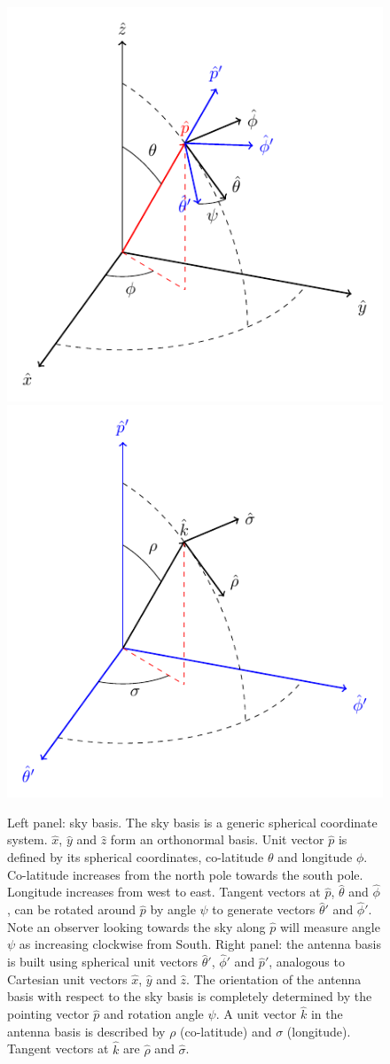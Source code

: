 \documentclass[a4paper,11pt]{article}
\begin{document}
\begin{figure}
	\centering
	\includegraphics[width=0.47\linewidth]{tikz/sky_basis}	
	\includegraphics[width=0.47\linewidth]{tikz/beam_basis}
	\caption{Left panel: sky basis. The sky basis is a generic spherical coordinate system. $\hat{x}$, $\hat{y}$ and $\hat{z}$ form an orthonormal basis. Unit vector $\hat{p}$ is defined by its spherical coordinates, co-latitude $\theta$ and longitude $\phi$. Co-latitude increases from the north pole towards the south pole. Longitude increases from west to east. Tangent vectors at $\hat{p}$, $\hat{\theta}$ and $\hat{\phi}$, can be rotated around $\hat{p}$ by angle $\psi$ to generate vectors $\hat{\theta}'$ and $\hat{\phi}'$. Note an observer looking towards the sky along $\hat{p}$ will measure angle $\psi$ as increasing clockwise from South. Right panel: the antenna basis is built using spherical unit vectors $\hat{\theta}'$, $\hat{\phi}'$ and $\hat{p}'$, analogous to Cartesian unit vectors $\hat{x}$, $\hat{y}$ and $\hat{z}$. The orientation of the antenna basis with respect to the sky basis is completely determined by the pointing vector $\hat{p}$ and rotation angle $\psi$. A unit vector $\hat{k}$ in the antenna basis is described by $\rho$ (co-latitude) and $\sigma$ (longitude). Tangent vectors at $\hat{k}$ are $\hat{\rho}$ and $\hat{\sigma}$. }
	\label{fig::sky_basis} 
\end{figure}
\end{document}

